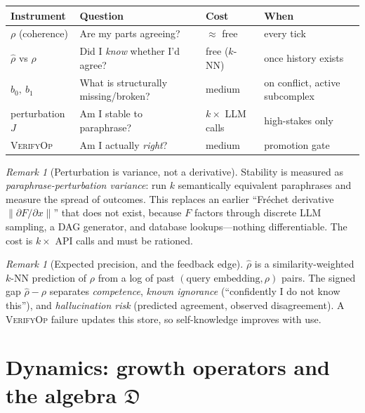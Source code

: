 \documentclass[11pt]{article}
\theoremstyle{definition}
\theoremstyle{plain}
\theoremstyle{remark}
\newtheorem{remark}[definition]{Remark}
\newcommand{\Dop}{\mathfrak{D}}     %
\newcommand{\norm}[1]{\left\lVert #1 \right\rVert}
\begin{document}
\begin{center}
\renewcommand{\arraystretch}{1.25}
\begin{tabular}{@{}p{3.1cm}p{5.4cm}p{2.6cm}p{2.7cm}@{}}
\hline
\textbf{Instrument} & \textbf{Question} & \textbf{Cost} & \textbf{When}\\
\hline
$\rho$ (coherence) & Are my parts agreeing? & $\approx$ free & every tick\\
$\hat\rho$ vs $\rho$ & Did I \emph{know} whether I'd agree? & free ($k$-NN) & once history exists\\
$b_0,\ b_1$ & What is structurally missing/broken? & medium & on conflict, active subcomplex\\
perturbation $J$ & Am I stable to paraphrase? & $k\times$ LLM calls & high-stakes only\\
\textsc{VerifyOp} & Am I actually \emph{right}? & medium & promotion gate\\
\hline
\end{tabular}
\end{center}

\begin{remark}[Perturbation is variance, not a derivative]
Stability is measured as \emph{paraphrase-perturbation variance}: run $k$ semantically
equivalent paraphrases and measure the spread of outcomes. This replaces an earlier
``Fréchet derivative $\norm{\partial F/\partial x}$'' that does not exist, because $F$
factors through discrete LLM sampling, a DAG generator, and database lookups---nothing
differentiable. The cost is $k\times$ API calls and must be rationed.
\end{remark}

\begin{remark}[Expected precision, and the feedback edge]
$\hat\rho$ is a similarity-weighted $k$-NN prediction of $\rho$ from a log of past
$(\text{query embedding},\rho)$ pairs. The signed gap $\hat\rho-\rho$ separates
\emph{competence}, \emph{known ignorance} (``confidently I do not know this''), and
\emph{hallucination risk} (predicted agreement, observed disagreement). A
\textsc{VerifyOp} failure updates this store, so self-knowledge improves with use.
\end{remark}

\section{Dynamics: growth operators and the algebra \texorpdfstring{$\Dop$}{D}}\label{sec:growth}
\end{document}
